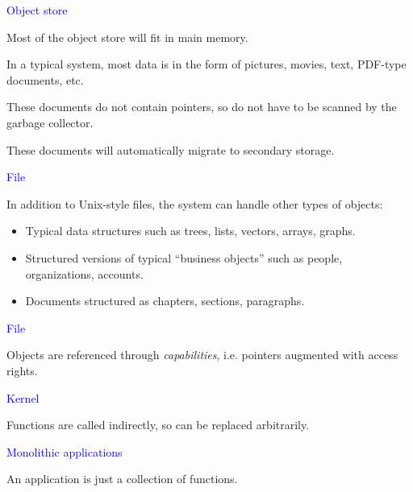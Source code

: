 \documentclass{slides}
\newcommand{\ti}[1]{\begin{center}\Large{\textcolor{blue}{#1}}\end{center}}
\begin{document}
\begin{slide}\ti{Object store}

Most of the object store will fit in main memory.

In a typical system, most data is in the form of pictures, movies,
text, PDF-type documents, etc.

These documents do not contain pointers, so do not have to be scanned
by the garbage collector.

These documents will automatically migrate to secondary storage.

\vfill\end{slide}
\begin{slide}\ti{File}

In addition to Unix-style files, the system can handle other types of
objects:

\begin{itemize}
\item Typical data structures such as trees, lists, vectors, arrays,
  graphs.
\item Structured versions of typical ``business objects'' such as
  people, organizations, accounts.
\item Documents structured as chapters, sections, paragraphs.
\end{itemize}

\vfill\end{slide}
\begin{slide}\ti{File}

Objects are referenced through \emph{capabilities}, i.e. pointers
augmented with access rights.

\vfill\end{slide}
\begin{slide}\ti{Kernel}

Functions are called indirectly, so can be replaced arbitrarily.

\vfill\end{slide}
\begin{slide}\ti{Monolithic applications}

An application is just a collection of functions.

\vfill\end{slide}
\end{document}
